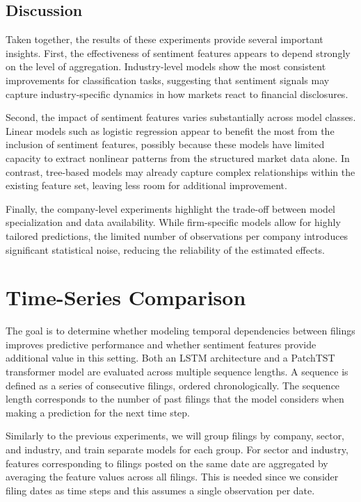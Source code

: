 \subsection{Discussion}

Taken together, the results of these experiments provide several important insights.
First, the effectiveness of sentiment features appears to depend strongly on the level of aggregation. Industry-level models show the most consistent improvements for classification tasks, suggesting that sentiment signals may capture industry-specific dynamics in how markets react to financial disclosures.

Second, the impact of sentiment features varies substantially across model classes. Linear models such as logistic regression appear to benefit the most from the inclusion of sentiment features, possibly because these models have limited capacity to extract nonlinear patterns from the structured market data alone. In contrast, tree-based models may already capture complex relationships within the existing feature set, leaving less room for additional improvement.

Finally, the company-level experiments highlight the trade-off between model specialization and data availability. While firm-specific models allow for highly tailored predictions, the limited number of observations per company introduces significant statistical noise, reducing the reliability of the estimated effects.

\section{Time-Series Comparison}

The goal is to determine whether modeling temporal dependencies between filings improves predictive performance and whether sentiment features provide additional value in this setting. Both an LSTM architecture and a PatchTST transformer model are evaluated across multiple sequence lengths.
A sequence is defined as a series of consecutive filings, ordered chronologically. The sequence length corresponds to the number of past filings that the model considers when making a prediction for the next time step.

Similarly to the previous experiments, we will group filings by company, sector, and industry, and train separate models for each group. For sector and industry, features corresponding to filings posted on the same date are aggregated by averaging the feature values across all filings. 
This is needed since we consider filing dates as time steps and this assumes a single observation per date.

